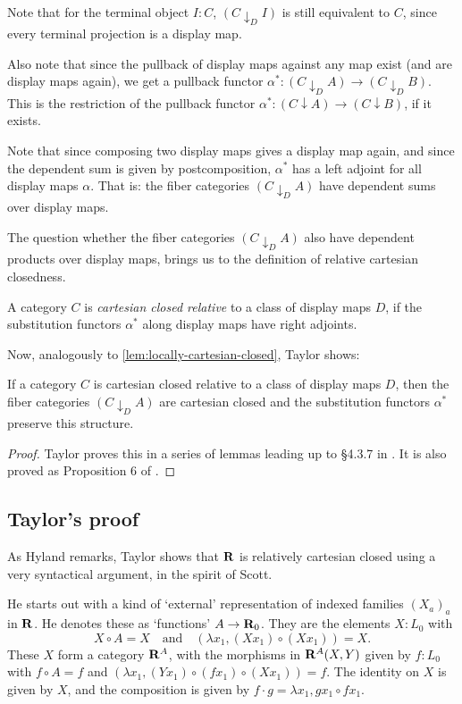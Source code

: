 Note that for the terminal object $ I : C $, $ (C \downarrow_D I) $ is still equivalent to $ C $, since every terminal projection is a display map.

Also note that since the pullback of display maps against any map exist (and are display maps again), we get a pullback functor $ \alpha^*: (C \downarrow_D A) \to (C \downarrow_D B) $. This is the restriction of the pullback functor $ \alpha^*: (C \downarrow A) \to (C \downarrow B) $, if it exists.

Note that since composing two display maps gives a display map again, and since the dependent sum is given by postcomposition, $ \alpha^* $ has a left adjoint for all display maps $ \alpha $. That is: the fiber categories $ (C \downarrow_D A) $ have dependent sums over display maps.

The question whether the fiber categories $ (C \downarrow_D A) $ also have dependent products over display maps, brings us to the definition of relative cartesian closedness.
\begin{definition}
  A category $ C $ is \textit{cartesian closed relative} to a class of display maps $ D $, if the substitution functors $ \alpha^* $ along display maps have right adjoints.
\end{definition}

Now, analogously to \ref{lem:locally-cartesian-closed}, Taylor shows:
\begin{lemma}
  If a category $ C $ is cartesian closed relative to a class of display maps $ D $, then the fiber categories $ (C \downarrow_D A) $ are cartesian closed and the substitution functors $ \alpha^* $ preserve this structure.
\end{lemma}
\begin{proof}
  Taylor proves this in a series of lemmas leading up to \S 4.3.7 in \autocite{taylor}. It is also proved as Proposition 6 of \autocite{theory-of-constructions}.
\end{proof}

\subsection{Taylor's proof}

As Hyland remarks, Taylor shows that $ \mathbf{R} $ is relatively cartesian closed using a very syntactical argument, in the spirit of Scott.

He starts out with a kind of `external' representation of indexed families $ (X_a)_a $ in $ \mathbf{R} $. He denotes these as `functions' $ A \to \mathbf{R}_0 $. They are the elements $ X: L_0 $ with
\[ X \circ A = X \quad \text{and} \quad (\lambda x_1, (X x_1) \circ (X x_1)) = X. \]
These $ X $ form a category $ \mathbf{R}^A $, with the morphisms in $ \mathbf{R}^A(X, Y) $ given by $ f: L_0 $ with $ f \circ A = f $ and $ (\lambda x_1, (Y x_1) \circ (f x_1) \circ (X x_1)) = f $. The identity on $ X $ is given by $ X $, and the composition is given by $ f \cdot g = \lambda x_1, g x_1 \circ f x_1 $.

